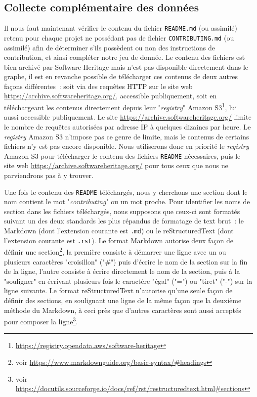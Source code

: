 \documentclass[dvipsnames]{llncs}
\newcommand{\en}[1]{\foreignlanguage{english}{\emph{#1}}}
\begin{document}
    \subsection{Collecte complémentaire des données}
    \label{sec:collectreadme}

    Il nous faut maintenant vérifier le contenu du fichier \texttt{README.md} (ou assimilé) retenu pour chaque
    projet ne possédant pas de fichier \texttt{CONTRIBUTING.md} (ou assimilé) afin de déterminer s'ils
    possèdent ou non des instructions de contribution, et ainsi compléter notre jeu de donnée. Le contenu des
    fichiers est bien archivé par Software Heritage mais n'est pas disponible directement dans le graphe, il
    est en revanche possible de télécharger ces contenus de deux autres façons différentes : soit via des
    requêtes HTTP sur le site web \url{https://archive.softwareheritage.org/}, accessible publiquement, soit
    en téléchargeant les contenus directement depuis leur "\en{registry}" Amazon
    S3\footnote{\url{https://registry.opendata.aws/software-heritage}}, lui aussi accessible publiquement. Le
    site \url{https://archive.softwareheritage.org/} limite le nombre de requêtes autorisées par adresse IP à
    quelques dizaines par heure. Le \en{registry} Amazon S3 n'impose pas ce genre de limite, mais le contenus
    de certains fichiers n'y est pas encore disponible. Nous utiliserons donc en priorité le \en{registry}
    Amazon S3 pour télécharger le contenu des fichiers \texttt{README} nécessaires, puis le site web
    \url{https://archive.softwareheritage.org/} pour tous ceux que nous ne parviendrons pas à y trouver.

    Une fois le contenu des \texttt{README} téléchargés, nous y cherchons une section dont le nom contient le
    mot "\en{contributing}" ou un mot proche. Pour identifier les noms de section dans les fichiers
    téléchargés, nous supposons que ceux-ci sont formatés suivant un des deux standards les plus répandus de
    formatage de text brut : le Markdown (dont l'extension courante est \texttt{.md}) ou le reStructuredText
    (dont l'extension courante est \texttt{.rst}). Le format Markdown autorise deux façon de définir une
    section\footnote{voir \url{https://www.markdownguide.org/basic-syntax/\#headings}}, la première consiste à
    démarrer une ligne avec un ou plusieurs caractères "croisillon" ("\#") puis d'écrire le nom de la section
    sur la fin de la ligne, l'autre consiste à écrire directement le nom de la section, puis à la "souligner"
    en écrivant plusieurs fois le caractère "égal" ("=") ou "tiret" ("-") sur la ligne suivante. Le format
    reStructuredText n'autorise qu'une seule façon de définir des sections, en soulignant une ligne de la même
    façon que la deuxième méthode du Markdown, à ceci près que d'autres caractères sont aussi acceptés pour
    composer la ligne\footnote{voir
    \url{https://docutils.sourceforge.io/docs/ref/rst/restructuredtext.html\#sections}}.
\end{document}
